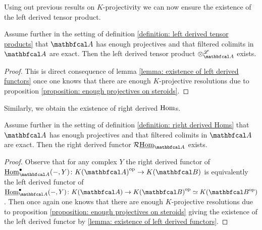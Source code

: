 
Using out previous results on $K$-projectivity we can now ensure the existence of the left derived tensor product.
\begin{corollary}
	Assume further in the setting of definition \ref{definition: left derived tensor products} that $\category{A}$ has enough projectives and that filtered colimits in $\category{A}$ are exact. Then the left derived tensor product $\Dotimes_\category{A}$ exists.
\end{corollary}
\begin{proof}
	This is direct consequence of lemma \ref{lemma: existence of left derived functors} once one knows that there are enough $K$-projective resolutions due to proposition \ref{proposition: enough projectives on steroids}.
\end{proof}

Similarly, we obtain the existence of right derived ${\operatorname{Hom}}$s.
\begin{corollary}
	\label{corollary: existence of right derived Homs}
	
	Assume further in the setting of definition \ref{definition: right derived Homs} that $\category{A}$ has enough projectives and that filtered colimits in $\category{A}$ are exact. Then the right derived functor $\RightD\eHom_\category{A}$ exists.
\end{corollary}
\begin{proof}
	Observe that for any complex $Y$ the right derived functor of $\eHom_\category{A}^\bullet(-, Y)\colon \homotopyCategoryOfComplexes{\category{A}}^\op \to \homotopyCategoryOfComplexes{\category{B}}$ is equivalently the left derived functor of $\eHom_\category{A}^\bullet(-, Y)\colon \homotopyCategoryOfComplexes{\category{A}} \to \homotopyCategoryOfComplexes{\category{B}}^\op\equiv \homotopyCategoryOfComplexes{\category{B}^\op}$. Then once again one knows that there are enough $K$-projective resolutions due to proposition \ref{proposition: enough projectives on steroids} giving the existence of the left derived functor by \ref{lemma: existence of left derived functors}.
\end{proof}


